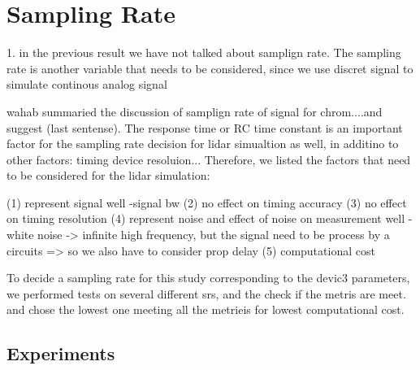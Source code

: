 
\section{Sampling Rate}
1. in the previous result we have not talked about samplign rate. 
The sampling rate is another variable that needs to be considered, since
we use discret signal to simulate continous analog signal

wahab summaried the discussion of samplign rate of signal for chrom....and suggest (last sentense).
The response time or RC time constant is  an important factor for the sampling rate decision for lidar simualtion as well, in additino to other factors: timing device resoluion... 
Therefore, we listed the factors that need to be considered for the lidar simulation:

(1) represent signal well
-signal bw
(2) no effect on timing accuracy
(3) no effect on timing resolution
(4) represent noise and effect of noise on measurement well
-white noise ->  infinite high frequency, but the signal need to be process by a circuits => so we also have to consider prop delay
(5) computational cost

To decide a sampling rate for this study corresponding to the devic3 parameters, we performed tests on several different srs, and the check if the metris are meet. and chose the lowest one  meeting all the metrieis for lowest computational cost.
\subsection{Experiments}














